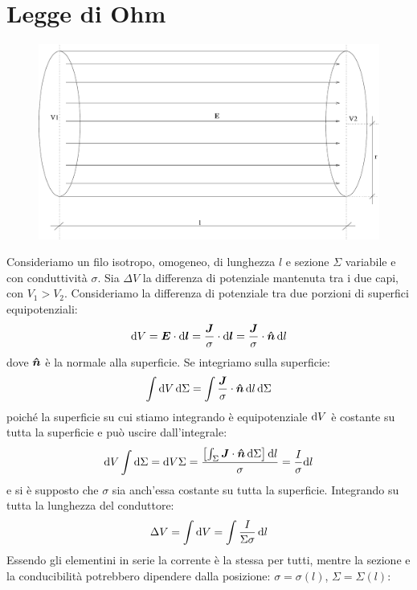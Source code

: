 \section{Legge di Ohm}
\begin{figure}[htbp]
  \centering
  \includegraphics[scale=0.4]{immagini/fisica2/ohm1}
\end{figure}
Consideriamo un filo isotropo, omogeneo, di lunghezza $l$ e sezione $\Sigma$ variabile e con conduttività $\sigma$. Sia $\Delta V$ la differenza di potenziale mantenuta tra i due capi, con $V_1>V_2$. Consideriamo la differenza di potenziale tra due porzioni di superfici equipotenziali:
\begin{equation}
  \mathrm{d} V = \boldsymbol{E}\cdot\mathrm{d} \boldsymbol{l} = \frac{\boldsymbol{J}}{\sigma}\cdot\mathrm{d}\boldsymbol{l}=\frac{\boldsymbol{J}}{\sigma}\cdot\boldsymbol{\hat {n}}\,\mathrm{d} l
\end{equation}
dove $\boldsymbol{\hat {n}}$ è la normale alla superficie. Se integriamo sulla superficie:
\begin{equation}
  \int\mathrm{d} V\,\mathrm{d}\Sigma=\int\frac{\boldsymbol{J}}{\sigma}\cdot\boldsymbol{\hat {n}}\,\mathrm{d} l\,\mathrm{d}\Sigma
\end{equation}
poiché la superficie su cui stiamo integrando è equipotenziale $\mathrm{d} V$ è costante su tutta la superficie e può uscire dall'integrale:
\begin{equation}
  \mathrm{d} V\int\mathrm{d}\Sigma = \mathrm{d} V\Sigma=\frac{\left[\int_\Sigma\boldsymbol{J}\cdot\boldsymbol{\hat {n}}\, \mathrm{d} \Sigma\right]\mathrm{d} l}{\sigma} = \frac{I}{\sigma}\mathrm{d} l
\end{equation}
e si è supposto che $\sigma$ sia anch'essa costante su tutta la superficie. Integrando su tutta la lunghezza del conduttore:
\begin{equation}
  \Delta V = \int\mathrm{d} V=\int\frac{I}{\Sigma\sigma}\,\mathrm{d} l
\end{equation}
Essendo gli elementini in serie la corrente è la stessa per tutti, mentre la sezione e la conducibilità potrebbero dipendere dalla posizione: $\sigma=\sigma(l)$, $\Sigma=\Sigma(l)$:
